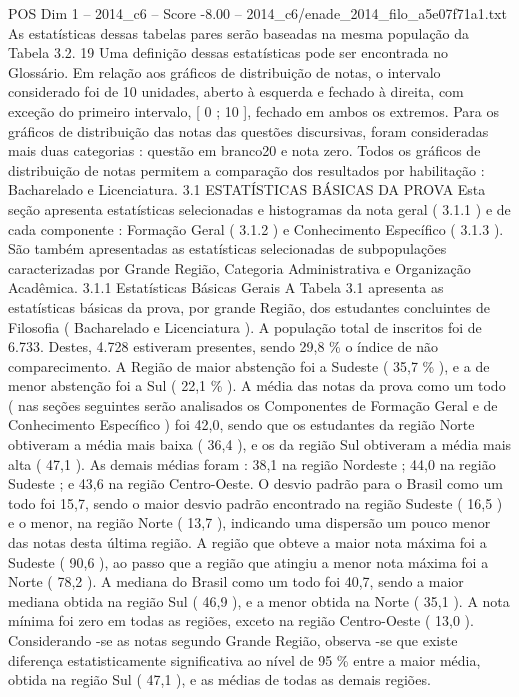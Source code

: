 \begin{textsample}{POS Dim 1 – 2014\_c6 – Score -8.00 – 2014\_c6/enade\_2014\_filo\_a5e07f71a1.txt}
As estatísticas dessas tabelas pares serão baseadas na mesma população da Tabela 3.2. 19 Uma definição dessas estatísticas pode ser encontrada no Glossário.
Em relação aos gráficos de distribuição de notas, o intervalo considerado foi de 10 unidades, aberto à esquerda e fechado à direita, com exceção do primeiro intervalo, [ 0 ; 10 ], fechado em ambos os extremos.
Para os gráficos de distribuição das notas das questões discursivas, foram consideradas mais duas categorias : questão em branco20 e nota zero.
Todos os gráficos de distribuição de notas permitem a comparação dos resultados por habilitação : Bacharelado e Licenciatura. 3.1 ESTATÍSTICAS BÁSICAS DA PROVA Esta seção apresenta estatísticas selecionadas e histogramas da nota geral ( 3.1.1 ) e de cada componente : Formação Geral ( 3.1.2 ) e Conhecimento Específico ( 3.1.3 ).
São também apresentadas as estatísticas selecionadas de subpopulações caracterizadas por Grande Região, Categoria Administrativa e Organização Acadêmica. 3.1.1 Estatísticas Básicas Gerais A Tabela 3.1 apresenta as estatísticas básicas da prova, por grande Região, dos estudantes concluintes de Filosofia ( Bacharelado e Licenciatura ).
A população total de inscritos foi de 6.733.
Destes, 4.728 estiveram presentes, sendo 29,8 \% o índice de não comparecimento.
A Região de maior abstenção foi a Sudeste ( 35,7 \% ), e a de menor abstenção foi a Sul ( 22,1 \% ).
A média das notas da prova como um todo ( nas seções seguintes serão analisados os Componentes de Formação Geral e de Conhecimento Específico ) foi 42,0, sendo que os estudantes da região Norte obtiveram a média mais baixa ( 36,4 ), e os da região Sul obtiveram a média mais alta ( 47,1 ).
As demais médias foram : 38,1 na região Nordeste ; 44,0 na região Sudeste ; e 43,6 na região Centro-Oeste.
O desvio padrão para o Brasil como um todo foi 15,7, sendo o maior desvio padrão encontrado na região Sudeste ( 16,5 ) e o menor, na região Norte ( 13,7 ), indicando uma dispersão um pouco menor das notas desta última região.
A região que obteve a maior nota máxima foi a Sudeste ( 90,6 ), ao passo que a região que atingiu a menor nota máxima foi a Norte ( 78,2 ).
A mediana do Brasil como um todo foi 40,7, sendo a maior mediana obtida na região Sul ( 46,9 ), e a menor obtida na Norte ( 35,1 ).
A nota mínima foi zero em todas as regiões, exceto na região Centro-Oeste ( 13,0 ).
Considerando -se as notas segundo Grande Região, observa -se que existe diferença estatisticamente significativa ao nível de 95 \% entre a maior média, obtida na região Sul ( 47,1 ), e as médias de todas as demais regiões.

\end{textsample}
